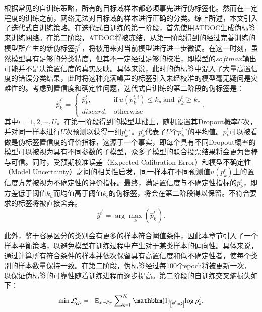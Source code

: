根据常见的自训练策略，所有的目标域样本都必须事先进行伪标签化。然而在一定程度的训练之前，网络无法对目标域的样本进行正确的分类。综上所述，本文引入了迭代式自训练策略。在迭代式自训练的第一阶段，首先使用ATDOC生成伪标签来训练网络。在第二阶段，ATDOC将被冻结，从第一阶段得到的经过完善训练的模型所产生的新伪标签$\hat{y}^{t^{'}}$，将被用来对当前模型进行进一步微调。在这一时刻，虽然模型具有足够的分类精度，但其不一定经过足够的校准，即模型的$softmax$输出可能并不是决策置信度的真实反映\cite{4-7}。具体来说，此时的伪标签中混入了大量高置信度的错误分类结果，此时将这种充满噪声的标签引入未经校准的模型毫无疑问是灾难性的。考虑到置信度和确定性问题，迭代式自训练的第二阶段的伪标签是：
\begin{equation}
\label{deqn_ex9_addation1}
\hat{p}_{k}^{t^{'}} = \left\{\begin{array}{cl}
\overline{p}_{k}^{t},&\text{if}\ {u}({p}_{k}^{t,i}) \leq {k}_{u}\ \text{and}\ \ \overline{p}_{k}^{t} \geq {k}_{c}\\ 
discard,&{\text{otherwise}}
\end{array}\right.,
\end{equation}
其中$i=1,2,\cdots,U$。在第一阶段得到的模型基础上，随机设置其Dropout概率$U$次，并对同一样本进行$U$次预测以获得一组${p}_{k}^{t,i}$。$\overline{p}_{k}^{t}$代表了$U$个${p}_{k}^{t,i}$的平均值。$\overline{p}_{k}^t$可以被看做是伪标签置信度的评价指标，这源于一个事实，即每个具有不同Dropout概率的模型可以被视为具有不同参数的子模型，众多子模型的联合投票结果将会更为鲁棒与可信。同时，受预期校准误差（Expected Calibration Error）\cite{4-7}和模型不确定性（Model Uncertainty）之间的相关性启发\cite{4-9}，同一样本在不同预测值${u}({p}_{k}^{t})$上的置信度方差被视为不确定性的评价指标。最终，满足置信度与不确定性指标的$\overline{p}_{k}^t$，即方差低于阈值${k}_{u}$而均值高于阈值${k}_{c}$的伪标签，将会在第二阶段得以保留。不符合要求的标签将被直接舍弃。
\begin{equation}
\label{deqn_ex9_addation2}
\hat{y}^{t^{'}} = \arg \max _{k} (\hat{p}_{k}^{t^{'}}).
\end{equation}

此外，鉴于容易区分的类别会有更多的样本符合阈值条件，因此本章节引入了一个样本平衡策略，以避免模型在训练过程中产生对于某类样本的偏向性。具体来说，通过计算所有符合条件的样本并依次保留具有高置信度和低不确定性者，使每个类别的样本数量保持一致。在第二阶段，伪标签经过每100个epoch将被更新一次，以保证伪标签的可靠性随着训练进程而逐步提高。第二阶段的自训练交叉熵损失如下：
\begin{equation}
\label{deqn_ex9}
\min{\mathcal{L}_{cls}^t=-\mathbb{E}_{x^t\sim P_\mathcal{T}}\sum\nolimits_{k=1}^{N_c}{\mathbbm{1}_{\left[{\hat{y}}^{t^{'}}=k\right]} {\log {p_k^t}}}}. 
\end{equation}

